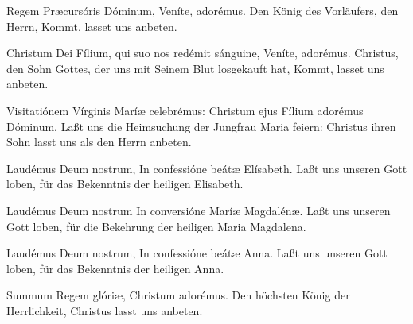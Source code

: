 \documentclass[fontsize=9pt,paper=A6,twoside,BCOR=1mm,DIV=22,headinclude]{scrarticle}
\begin{document}
\begin{paracol}{2}\pcb
	Regem Præcursóris Dóminum, \red{*} Veníte, adorémus.
	\switchcolumn 
	Den König des Vorläufers, den Herrn, \red{*} Kommt, lasset uns anbeten.
\end{paracol}

\begin{paracol}{2}\pcb
	Christum Dei Fílium, qui suo nos redémit sánguine, \red{*} Veníte, adorémus.
	\switchcolumn 
	Christus, den Sohn Gottes, der uns mit Seinem Blut losgekauft hat, \red{*} Kommt, lasset uns anbeten.
\end{paracol}

\begin{paracol}{2}\pcb
	Visitatiónem Vírginis Maríæ celebrémus: \red{*} Christum ejus Fílium adorémus Dóminum.
	\switchcolumn
	Laßt uns die Heimsuchung der Jungfrau Maria feiern: \red{*} Christus ihren Sohn lasst uns als den Herrn anbeten.
\end{paracol}

\begin{paracol}{2}\pcb
	Laudémus Deum nostrum, \red{*} In confessióne beátæ Elísabeth.
	\switchcolumn 
	Laßt uns unseren Gott loben, \red{*} für das Bekenntnis der heiligen Elisabeth.
\end{paracol}

\begin{paracol}{2}\pcb
	Laudémus Deum nostrum \red{*} In conversióne Maríæ Magdalénæ.
	\switchcolumn
	Laßt uns unseren Gott loben, \red{*} für die Bekehrung der heiligen Maria Magdalena.
\end{paracol}

\begin{paracol}{2}\pcb
	Laudémus Deum nostrum, \red{*} In confessióne beátæ Anna.
	\switchcolumn 
	Laßt uns unseren Gott loben, \red{*} für das Bekenntnis der heiligen Anna.
\end{paracol}

\pagebreak
{}
\begin{paracol}{2}\pcb
	Summum Regem glóriæ, \red{*} Christum adorémus.
	\switchcolumn
	Den höchsten König der Herrlichkeit, \red{*} Christus lasst uns anbeten.
\end{paracol}
\end{document}
